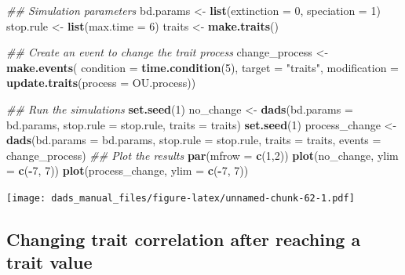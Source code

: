 \documentclass[]{book}
\newenvironment{Shaded}{\begin{snugshade}}{\end{snugshade}}
\newcommand{\CommentTok}[1]{\textcolor[rgb]{0.56,0.35,0.01}{\textit{#1}}}
\newcommand{\DataTypeTok}[1]{\textcolor[rgb]{0.13,0.29,0.53}{#1}}
\newcommand{\DecValTok}[1]{\textcolor[rgb]{0.00,0.00,0.81}{#1}}
\newcommand{\KeywordTok}[1]{\textcolor[rgb]{0.13,0.29,0.53}{\textbf{#1}}}
\newcommand{\NormalTok}[1]{#1}
\newcommand{\OperatorTok}[1]{\textcolor[rgb]{0.81,0.36,0.00}{\textbf{#1}}}
\newcommand{\StringTok}[1]{\textcolor[rgb]{0.31,0.60,0.02}{#1}}
\begin{document}
\begin{Shaded}
\begin{Highlighting}[]
\CommentTok{## Simulation parameters}
\NormalTok{bd.params <-}\StringTok{ }\KeywordTok{list}\NormalTok{(}\DataTypeTok{extinction =} \DecValTok{0}\NormalTok{, }\DataTypeTok{speciation =} \DecValTok{1}\NormalTok{)}
\NormalTok{stop.rule <-}\StringTok{ }\KeywordTok{list}\NormalTok{(}\DataTypeTok{max.time =} \DecValTok{6}\NormalTok{)}
\NormalTok{traits    <-}\StringTok{ }\KeywordTok{make.traits}\NormalTok{()}

\CommentTok{## Create an event to change the trait process}
\NormalTok{change_process <-}\StringTok{ }\KeywordTok{make.events}\NormalTok{(}
                  \DataTypeTok{condition    =} \KeywordTok{time.condition}\NormalTok{(}\DecValTok{5}\NormalTok{),}
                  \DataTypeTok{target       =} \StringTok{"traits"}\NormalTok{,}
                  \DataTypeTok{modification =} \KeywordTok{update.traits}\NormalTok{(}\DataTypeTok{process =}\NormalTok{ OU.process))}

\CommentTok{## Run the simulations}
\KeywordTok{set.seed}\NormalTok{(}\DecValTok{1}\NormalTok{)}
\NormalTok{no_change <-}\StringTok{ }\KeywordTok{dads}\NormalTok{(}\DataTypeTok{bd.params =}\NormalTok{ bd.params,}
                  \DataTypeTok{stop.rule =}\NormalTok{ stop.rule,}
                  \DataTypeTok{traits    =}\NormalTok{ traits)}
\KeywordTok{set.seed}\NormalTok{(}\DecValTok{1}\NormalTok{)}
\NormalTok{process_change <-}\StringTok{ }\KeywordTok{dads}\NormalTok{(}\DataTypeTok{bd.params =}\NormalTok{ bd.params,}
                       \DataTypeTok{stop.rule =}\NormalTok{ stop.rule,}
                       \DataTypeTok{traits    =}\NormalTok{ traits,}
                       \DataTypeTok{events    =}\NormalTok{ change_process)}
\CommentTok{## Plot the results}
\KeywordTok{par}\NormalTok{(}\DataTypeTok{mfrow =} \KeywordTok{c}\NormalTok{(}\DecValTok{1}\NormalTok{,}\DecValTok{2}\NormalTok{))}
\KeywordTok{plot}\NormalTok{(no_change, }\DataTypeTok{ylim =} \KeywordTok{c}\NormalTok{(}\OperatorTok{-}\DecValTok{7}\NormalTok{, }\DecValTok{7}\NormalTok{))}
\KeywordTok{plot}\NormalTok{(process_change, }\DataTypeTok{ylim =} \KeywordTok{c}\NormalTok{(}\OperatorTok{-}\DecValTok{7}\NormalTok{, }\DecValTok{7}\NormalTok{))}
\end{Highlighting}
\end{Shaded}

\texttt{[image: dads\_manual\_files/figure-latex/unnamed-chunk-62-1.pdf]}

\hypertarget{changing-trait-correlation-after-reaching-a-trait-value}{%
\subsection{Changing trait correlation after reaching a trait value}\label{changing-trait-correlation-after-reaching-a-trait-value}}
\end{document}
